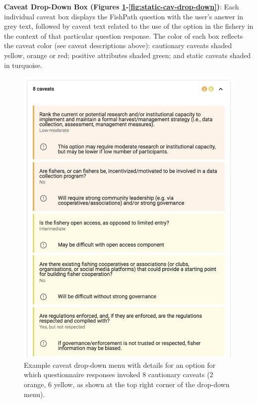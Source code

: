 \documentclass[11pt,]{book}
\begin{document}
\textbf{Caveat Drop-Down Box (Figures \ref{fig:cav-drop-down}-\ref{fig:static-cav-drop-down})}: Each individual caveat box displays the FishPath question with the user's answer in grey text, followed by caveat text related to the use of the option in the fishery in the context of that particular question response. The color of each box reflects the caveat color (see caveat descriptions above): cautionary caveats shaded yellow, orange or red; positive attributes shaded green; and static caveats shaded in turquoise.

\begin{figure}

{\centering \includegraphics[width=0.75\linewidth]{images/cav-drop-down} 

}

\caption{Example caveat drop-down menu with details for an option for which questionnaire responses invoked 8 cautionary caveats (2 orange, 6 yellow, as shown at the top right corner of the drop-down menu).}\label{fig:cav-drop-down}
\end{figure}
\end{document}
